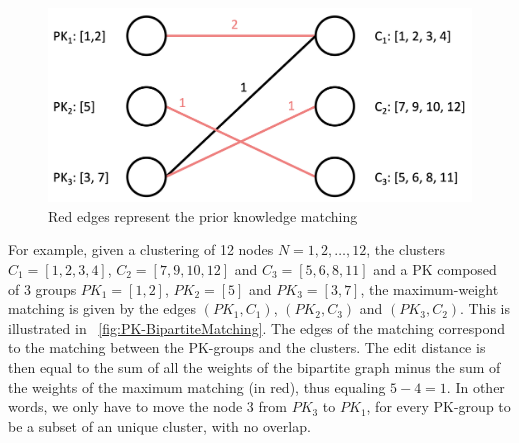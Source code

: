 


\begin{figure}[!ht]
\centering
\includegraphics[width=0.7\linewidth]{static/figures/PK-Clustering/VISPaperFigures/bipartiteMatching.png}
\caption{Red edges represent the prior knowledge matching}
\label{fig:PK-BipartiteMatching}
\end{figure}


For example, given a clustering of 12 nodes $N = {1,2, \ldots, 12}$, the clusters $C_1 = [1,2,3,4]$, $C_2 = [7,9,10,12]$ and $C_3 = [5,6,8,11]$ and a PK composed of 3 groups $PK_1 = [1,2]$, $PK_2 = [5]$ and $PK_3 = [3,7]$, the maximum-weight matching is given by the edges $(PK_1, C_1)$, $(PK_2, C_3)$ and $(PK_3, C_2)$. This is illustrated in ~\autoref{fig:PK-BipartiteMatching}. The edges of the matching correspond to the matching between the PK-groups and the clusters. The edit distance is then equal to the sum of all the weights of the bipartite graph minus the sum of the weights of the maximum matching (in red), thus equaling $5 - 4 = 1$. In other words, we only have to move the node 3 from $PK_3$ to $PK_1$, for every PK-group to be a subset of an unique cluster, with no overlap.


